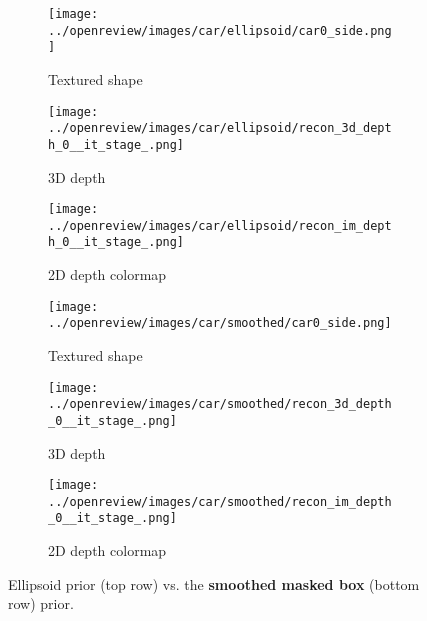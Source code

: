 \begin{figure}[!htb]
    \centering
    \begin{subfigure}[t]{0.28\textwidth}
        \centering
        \texttt{[image: ../openreview/images/car/ellipsoid/car0\_side.png]}
        \caption{Textured shape}
        
    \end{subfigure}
    \begin{subfigure}[t]{0.28\textwidth}
        \centering
        \texttt{[image: ../openreview/images/car/ellipsoid/recon\_3d\_depth\_0\_\_it\_stage\_.png]}
        \caption{3D depth}
        
    \end{subfigure}
    \begin{subfigure}[t]{0.28\textwidth}
        \centering
        \texttt{[image: ../openreview/images/car/ellipsoid/recon\_im\_depth\_0\_\_it\_stage\_.png]}
        \caption{2D depth colormap}
        
    \end{subfigure}
    \begin{subfigure}[t]{0.28\textwidth}
        \centering
        \texttt{[image: ../openreview/images/car/smoothed/car0\_side.png]}
        \caption{Textured shape}
        
    \end{subfigure}
    \begin{subfigure}[t]{0.28\textwidth}
        \centering
        \texttt{[image: ../openreview/images/car/smoothed/recon\_3d\_depth\_0\_\_it\_stage\_.png]}
        \caption{3D depth}
        
    \end{subfigure}
    \begin{subfigure}[t]{0.28\textwidth}
        \centering
        \texttt{[image: ../openreview/images/car/smoothed/recon\_im\_depth\_0\_\_it\_stage\_.png]}
        \caption{2D depth colormap}
        
    \end{subfigure}
    \caption{Ellipsoid prior (top row) vs. the \textbf{smoothed masked box} (bottom row) prior.}
    \label{fig:3d_depth_diff_priors}
\end{figure}


